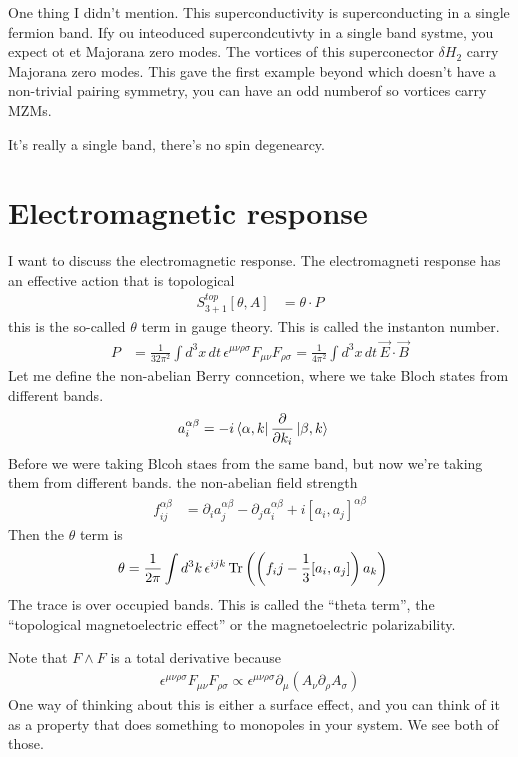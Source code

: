 One thing I didn't mention.
This superconductivity is superconducting in a single fermion band.
Ify ou inteoduced supercondcutivty in a single band systme,
you expect ot et Majorana zero modes.
The vortices of this superconector $\delta H_2$ carry Majorana zero modes.
This gave the first example beyond
which doesn't have a non-trivial pairing symmetry,
you can have an odd numberof so vortices carry MZMs.

It's really a single band,
there's no spin degenearcy.

\section{Electromagnetic response}
I want to discuss the electromagnetic response.
The electromagneti response has an effective action that is topological
\begin{align}
    S_{3+1}^{top}[\theta, A] &= \theta\cdot P
\end{align}
this is the so-called $\theta$ term in gauge theory.
This is called the instanton number.
\begin{align}
    P &= \frac{1}{32\pi^2} \int d^3x\, dt\,
    \epsilon^{\mu\nu\rho\sigma} F_{\mu\nu} F_{\rho\sigma}
    =
    \frac{1}{4\pi^2} \int d^3x\, dt\, \vec{E}\cdot\vec{B}
\end{align}
Let me define the non-abelian Berry conncetion,
where we take Bloch states from different bands.
\begin{align}
    a_i^{\alpha\beta} &=
    -i \bra{\alpha,k}
    \frac{\partial}{\partial k_i}
    \ket{\beta,k}
\end{align}
Before we were taking Blcoh staes from the same band,
but now we're taking them from different bands.
the non-abelian field strength
\begin{align}
    f_{ij}^{\alpha\beta} &=
    \partial_i a_j^{\alpha\beta}
    - \partial_j a_i^{\alpha\beta}
    + i[a_i, a_j]^{\alpha\beta}
\end{align}
Then the $\theta$ term is
\begin{align}
    \theta &=
    \frac{1}{2\pi}\int d^3k \, \epsilon^{ijk}\Tr\left( 
    \left( f_ij - \frac{1}{3}[a_i, a_j] \right)a_k
    \right)
\end{align}
The trace is over occupied bands.
This is called the ``theta term'',
the ``topological magnetoelectric effect''
or the magnetoelectric polarizability.

Note that $F\wedge F$ is a total derivative because
\begin{align}
    \epsilon^{\mu\nu\rho\sigma} F_{\mu\nu} F_{\rho\sigma}
    \propto
    \epsilon^{\mu\nu\rho\sigma} \partial_{\mu}\left( 
    A_\nu \partial_\rho A_\sigma
    \right)
\end{align}
One way of thinking about this is either a surface effect,
and you can think of it as a property that does something to monopoles in your
system.
We see both of those.

